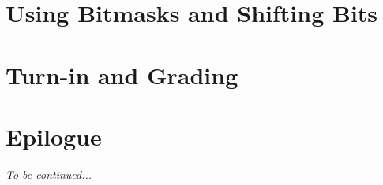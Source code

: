 \section{Using Bitmasks and Shifting Bits} \label{sec:bitOps}               

\section{Turn-in and Grading}                                               

\section*{Epilogue}                                                         \HasKeyboard

\textit{To be continued...}



